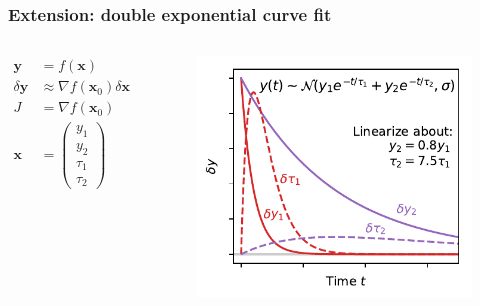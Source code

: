 \documentclass[xcolor={dvipsnames}]{beamer}
\begin{document}
\begin{frame}
\frametitle{Extension: double exponential curve fit}
\begin{columns}
    \begin{align*}
    \mathbf{y}& = f(\mathbf{x}) \\
    \delta \mathbf{y}& \approx \nabla f(\mathbf{x}_0) \delta \mathbf{x} \\
    J& = \nabla f(\mathbf{x}_0) \\
    \mathbf{x}& = \begin{pmatrix}
    y_1 \\
    y_2 \\
    \tau_1 \\
    \tau_2
    \end{pmatrix}
    \end{align*}

    \begin{figure}
    \includegraphics[width=\textwidth]{figs/two-time-constants-Jac.pdf}
    \end{figure}
\end{columns}
\end{frame}
\end{document}
